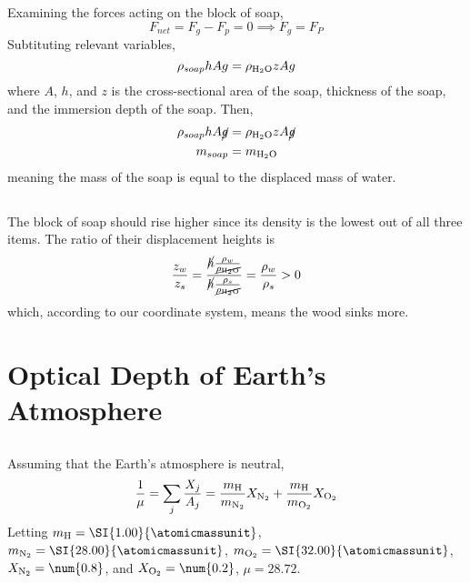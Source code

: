 \documentclass{article}
\newcommand{\water}{\ce{H2O}}
\begin{document}
\subsection{}

Examining the forces acting on the block of soap,
\begin{equation}
    F_{net} = F_g - F_p = 0 \implies F_g = F_P
\end{equation}
Subtituting relevant variables,
\begin{equation}
    \rho_{soap} h A g = \rho_{\water} z A g
\end{equation}
where \(A\), \(h\), and \(z\) is the cross-sectional area of the soap, thickness of the soap, and the immersion depth of the soap.
Then, 
\begin{align}
    \rho_{soap} h A \cancel{g} &= \rho_{\water} z A \cancel{g} \\
    m_{soap} &= m_{\water}
\end{align}
meaning the mass of the soap is equal to the displaced mass of water.

\subsection{}

The block of soap should rise higher since its density is the lowest out of all three items.
The ratio of their displacement heights is
\begin{equation}
    \frac{z_w}{z_s} = \frac{\cancel{h} \frac{\rho_w}{\cancel{\rho_{\water}}}}{\cancel{h} \frac{\rho_s}{\cancel{\rho_{\water}}}} = \frac{\rho_w}{\rho_s} > 0
\end{equation}
which, according to our coordinate system, means the wood sinks more.

\section{Optical Depth of Earth's Atmosphere}

\subsection{}

Assuming that the Earth's atmosphere is neutral,
\begin{equation}
    \frac{1}{\mu} = \sum_j \frac{X_j}{A_j} = \frac{m_{\ce{H}}}{m_{\ce{N2}}} X_{\ce{N2}} + \frac{m_{\ce{H}}}{m_{\ce{O2}}} X_{\ce{O2}}
\end{equation}
Letting \(m_{\ce{H}} = \SI{1.00}{\atomicmassunit}\), \(m_{\ce{N2}} = \SI{28.00}{\atomicmassunit}\), \(m_{\ce{O2}} = \SI{32.00}{\atomicmassunit}\), \(X_{\ce{N2}} = \num{0.8}\), and \(X_{\ce{O2}} = \num{0.2}\), \(\mu = \num{28.72}\).
\end{document}
